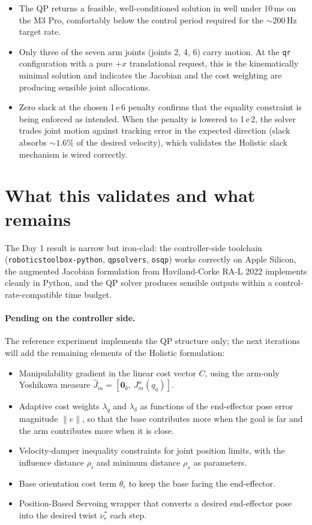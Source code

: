 \documentclass[11pt]{article}
\begin{document}
\begin{itemize}[noitemsep]
  \item The QP returns a feasible, well-conditioned solution in well
        under $10\,$ms on the M3 Pro, comfortably below the control
        period required for the $\sim 200\,$Hz target rate.
  \item Only three of the seven arm joints (joints 2, 4, 6) carry
        motion. At the \texttt{qr} configuration with a pure $+x$
        translational request, this is the kinematically minimal
        solution and indicates the Jacobian and the cost weighting are
        producing sensible joint allocations.
  \item Zero slack at the chosen 1\,e\,6 penalty confirms that the
        equality constraint is being enforced as intended. When the
        penalty is lowered to 1\,e\,2, the solver trades joint motion
        against tracking error in the expected direction (slack
        absorbs $\sim 1.6\%$ of the desired velocity), which validates
        the Holistic slack mechanism is wired correctly.
\end{itemize}

\section{What this validates and what remains}

The Day 1 result is narrow but iron-clad: the controller-side toolchain
(\texttt{roboticstoolbox-python}, \texttt{qpsolvers}, \texttt{osqp})
works correctly on Apple Silicon, the augmented Jacobian formulation
from Haviland-Corke RA-L 2022 implements cleanly in Python, and the QP
solver produces sensible outputs within a control-rate-compatible
time budget.

\paragraph{Pending on the controller side.} The reference experiment
implements the QP structure only; the next iterations will add the
remaining elements of the Holistic formulation:
\begin{itemize}[noitemsep]
  \item Manipulability gradient in the linear cost vector $C$, using
        the arm-only Yoshikawa measure
        \(\hat{J}_m = [\mathbf{0}_b,\ J^a_m(q_a)]\).
  \item Adaptive cost weights $\lambda_q$ and $\lambda_\delta$ as
        functions of the end-effector pose error magnitude
        $\|e\|$, so that the base contributes more when the goal is
        far and the arm contributes more when it is close.
  \item Velocity-damper inequality constraints for joint position
        limits, with the influence distance $\rho_i$ and minimum
        distance $\rho_s$ as parameters.
  \item Base orientation cost term $\theta_\epsilon$ to keep the base
        facing the end-effector.
  \item Position-Based Servoing wrapper that converts a desired
        end-effector pose into the desired twist $\nu^*_e$ each step.
\end{itemize}
\end{document}
